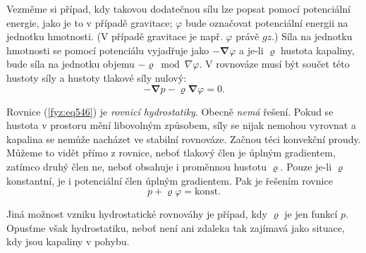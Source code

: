     Vezměme si případ, kdy takovou dodatečnou sílu lze popsat pomocí potenciální energie, jako je 
    to v případě gravitace; \(\varphi\) bude označovat potenciální energii na jednotku hmotnosti. 
    (V případě gravitace je např. \(\varphi\) právě \(gz\).) Síla na jednotku hmotnosti se pomocí 
    potenciálu vyjadřuje jako \(-\symbf{\nabla}\varphi\) a je-li \(\varrho\) hustota kapaliny, bude 
    síla na jednotku objemu \(-\varrho\bmod{\nabla}\varphi\). V rovnováze musí být součet této 
    hustoty síly a hustoty tlakové síly nulový:
    \begin{equation}\label{fyz:eq546}
      - \symbf{\nabla} p - \varrho\symbf{\nabla}\varphi = 0.
    \end{equation}
    
    Rovnice (\ref{fyz:eq546}) je \emph{rovnicí hydrostatiky}. Obecně \emph{nemá} řešení. Pokud se 
    hustota v prostoru mění libovolným způsobem, síly se nijak nemohou vyrovnat a kapalina se 
    nemůže nacházet ve stabilní rovnováze. Začnou téci konvekční proudy. Můžeme to vidět přímo z 
    rovnice, neboť tlakový člen je úplným gradientem, zatímco druhý člen ne, neboť obsahuje i 
    proměnnou hustotu \(\varrho\). Pouze je-li \(\varrho\) konstantní, je i potenciální člen úplným 
    gradientem. Pak je řešením rovnice
    \begin{equation*}
      p + \varrho\varphi = \text{konst}. 
    \end{equation*}
    
    Jiná možnost vzniku hydrostatické rovnováhy je případ, kdy \(\varrho\) je jen funkcí \(p\). 
    Opusťme však hydrostatiku, neboť není ani zdaleka tak zajímavá jako situace, kdy jsou kapaliny 
    v pohybu.
    
